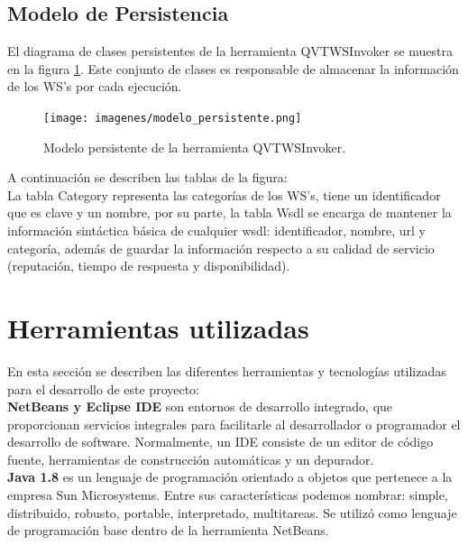   \subsection{Modelo de Persistencia}
  
  El diagrama de clases persistentes de la herramienta QVTWSInvoker se muestra en la figura \ref{fig:Modelo persistente de la herramienta QVTWSInvoker}. Este conjunto de clases es responsable de almacenar la información de los WS's por cada ejecución. \\
  
  \begin{figure}[!h] 
  	\begin{center}
  		\texttt{[image: imagenes/modelo\_persistente.png]}
  	\end{center}
  	\caption{Modelo persistente de la herramienta QVTWSInvoker.}
  	\label{fig:Modelo persistente de la herramienta QVTWSInvoker}
  \end{figure}
  
  A continuación se describen las tablas de la figura:\\
  
  La tabla Category representa las categorías de los WS's, tiene un identificador que es clave y un nombre, por su parte, la tabla Wsdl se encarga de mantener la información sintáctica básica de cualquier wsdl: identificador, nombre, url y categoría, además de guardar la información respecto a su calidad de servicio (reputación, tiempo de respuesta y disponibilidad).\\
  
  
\section{Herramientas utilizadas}
  
En esta sección se describen las diferentes herramientas y tecnologías utilizadas para el desarrollo de este proyecto:\\

\textbf{NetBeans y Eclipse IDE} son entornos de desarrollo integrado, que proporcionan servicios integrales para facilitarle al desarrollador o programador el desarrollo de software. Normalmente, un IDE consiste de un editor de código fuente, herramientas de construcción automáticas y un depurador.\\

\textbf{Java 1.8} es un lenguaje de programación orientado a objetos que pertenece a la empresa Sun Microsystems. Entre sus características podemos nombrar: simple, distribuido, robusto, portable, interpretado, multitareas. Se utilizó como lenguaje de programación base dentro de la herramienta NetBeans.\\


